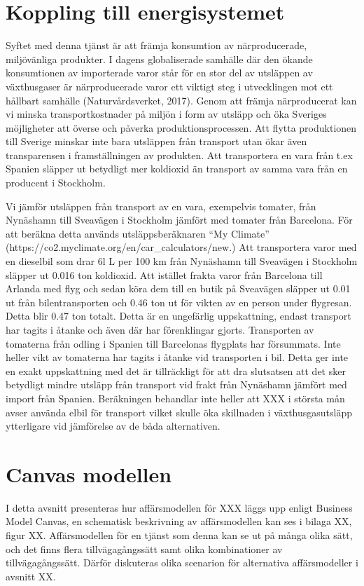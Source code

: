 \documentclass[10pt,a4paper,oneside]{article}
\begin{document}
\newpage

\section{Koppling till energisystemet}

Syftet med denna tjänst är att främja konsumtion av närproducerade, miljövänliga produkter.  I dagens globaliserade samhälle där den ökande konsumtionen av importerade varor står för en stor del av utsläppen av växthusgaser är närproducerade varor ett viktigt steg i utvecklingen mot ett hållbart samhälle (Naturvårdsverket, 2017). Genom att främja närproducerat kan vi minska transportkostnader på miljön i form av utsläpp och öka Sveriges möjligheter att överse och påverka produktionsprocessen. Att flytta produktionen till Sverige minskar inte bara utsläppen från transport utan ökar även transparensen i framställningen av produkten. Att transportera en vara från t.ex Spanien släpper ut betydligt mer koldioxid än transport av samma vara från en producent i Stockholm.   

Vi jämför utsläppen från transport av en vara, exempelvis tomater, från Nynäshamn till Sveavägen i Stockholm jämfört med tomater från Barcelona. För att beräkna detta används utsläppsberäknaren “My Climate” (https://co2.myclimate.org/en/car_calculators/new.) Att transportera varor med en dieselbil som drar 6l L per 100 km från Nynäshamn till Sveavägen i Stockholm släpper ut 0.016 ton koldioxid. Att istället frakta varor från Barcelona till Arlanda med flyg och sedan köra dem till en butik på Sveavägen släpper ut 0.01 ut från bilentransporten och 0.46 ton ut för vikten av en person under flygresan. Detta blir 0.47 ton totalt. Detta är en ungefärlig uppskattning, endast transport har tagits i åtanke och även där har förenklingar gjorts. Transporten av tomaterna från odling i Spanien till Barcelonas flygplats har försummats. Inte heller vikt av tomaterna har tagits i åtanke vid transporten i bil. Detta ger inte en exakt uppskattning med det är tillräckligt för att dra slutsatsen att det sker betydligt mindre utsläpp från transport vid frakt från Nynäshamn jämfört med import från Spanien. Beräkningen behandlar inte heller att XXX i största mån avser använda elbil för transport vilket skulle öka skillnaden i växthusgasutsläpp ytterligare vid jämförelse av de båda alternativen.

\newpage

\section{Canvas modellen}
I detta avsnitt presenteras hur affärsmodellen för XXX läggs upp enligt Business Model Canvas, en schematisk beskrivning av affärsmodellen kan ses i bilaga XX, figur XX. Affärsmodellen för en tjänst som denna kan se ut på många olika sätt, och det finns flera tillvägagångssätt samt olika kombinationer av tillvägagångssätt. Därför diskuteras olika scenarion för alternativa affärsmodeller i avsnitt XX. 
\end{document}
